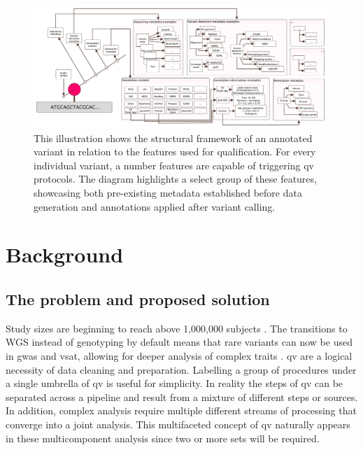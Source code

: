 \begin{figure}[h]
\centering
     \includegraphics[width=0.99\textwidth]{./images/qv_structure_vcurrent.pdf}
\caption{This illustration shows the structural framework of an annotated variant in relation to the features used for qualification. For every individual variant, a number features are capable of triggering \ac{qv} protocols. The diagram highlights a select group of these features, showcasing both pre-existing metadata established before data generation and annotations applied after variant calling.}
\label{fig:qv_structure_vcurrent}
\end{figure}




\section{Background}
\subsection{The problem and proposed solution}


Study sizes are beginning to reach above 1,000,000 subjects
\cite{lee2018gene, jansen2019genome}.
The transitions to WGS instead of genotyping by default means that rare variants can now be used in \ac{gwas} and \ac{vsat}, allowing for deeper analysis of complex traits
\cite{manolio2009finding, young2019solving}. %
\ac{qv} are a logical necessity of data cleaning and preparation. 
Labelling a group of procedures under a single umbrella of \ac{qv} is useful for simplicity. 
In reality the steps of \ac{qv} can be separated across a pipeline and result from a mixture of different steps or sources. 
In addition, complex analysis require multiple different streams of processing that converge into a joint analysis.
This multifaceted concept of \ac{qv} naturally appears in these multicomponent analysis since two or more sets will be required.

